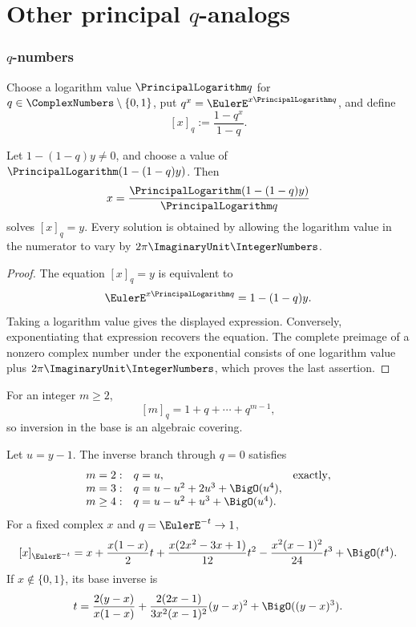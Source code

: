 \part{\texorpdfstring{Other principal \(q\)-analogs}{Other principal q-analogs}}

\section{\texorpdfstring{\(q\)-numbers}{q-numbers}}
\label{sec:qs-qnumbers}

Choose a logarithm value \(\PrincipalLogarithm q\) for \(q\in\ComplexNumbers\setminus\{0,1\}\), put
\(q^x=\EulerE^{x\PrincipalLogarithm q}\), and define
\[
  [x]_q:=\frac{1-q^x}{1-q}.
\]

\begin{proposition}
\label{prop:qs-qnumber-x}
Let \(1-(1-q)y\ne0\), and choose a value of
\(\PrincipalLogarithm(1-(1-q)y)\).  Then
\[
  x=\frac{\PrincipalLogarithm(1-(1-q)y)}{\PrincipalLogarithm q}
\]
solves \([x]_q=y\).  Every solution is obtained by allowing the logarithm
value in the numerator to vary by \(2\pi\ImaginaryUnit\IntegerNumbers\).
\end{proposition}

\begin{proof}
The equation \([x]_q=y\) is equivalent to
\[
  \EulerE^{x\PrincipalLogarithm q}=1-(1-q)y.
\]
Taking a logarithm value gives the displayed expression.  Conversely,
exponentiating that expression recovers the equation.  The complete
preimage of a nonzero complex number under the exponential consists of one
logarithm value plus \(2\pi\ImaginaryUnit\IntegerNumbers\), which proves the last assertion.
\end{proof}

For an integer \(m\ge2\),
\[
  [m]_q=1+q+\cdots+q^{m-1},
\]
so inversion in the base is an algebraic covering.

\begin{proposition}
\label{prop:qs-qnumber-jets}
Let \(u=y-1\).  The inverse branch through \(q=0\) satisfies
\[
\begin{array}{rll}
 m=2:&q=u,&\text{exactly},\\
 m=3:&q=u-u^2+2u^3+\BigO(u^4),&\\
 m\ge4:&q=u-u^2+u^3+\BigO(u^4).&
\end{array}
\]
For a fixed complex \(x\) and \(q=\EulerE^{-t}\to1\),
\[
  [x]_{\EulerE^{-t}}
  =x+\frac{x(1-x)}2t
   +\frac{x(2x^2-3x+1)}{12}t^2
   -\frac{x^2(x-1)^2}{24}t^3+\BigO(t^4).
\]
If \(x\notin\{0,1\}\), its base inverse is
\[
  t=\frac{2(y-x)}{x(1-x)}
   +\frac{2(2x-1)}{3x^2(x-1)^2}(y-x)^2
   +\BigO((y-x)^3).
\]
\end{proposition}

